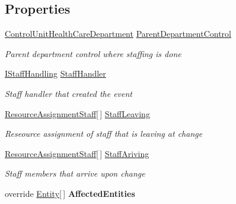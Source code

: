 \subsection*{Properties}
\begin{DoxyCompactItemize}
\item 
\hyperlink{class_general_health_care_elements_1_1_control_units_1_1_control_unit_health_care_department}{Control\+Unit\+Health\+Care\+Department} \hyperlink{class_general_health_care_elements_1_1_staff_handling_1_1_event_staff_change_a6874d8612be13bd29e3b98c02811739c}{Parent\+Department\+Control}
\begin{DoxyCompactList}\small\item\em Parent department control where staffing is done \end{DoxyCompactList}\item 
\hyperlink{interface_general_health_care_elements_1_1_staff_handling_1_1_i_staff_handling}{I\+Staff\+Handling} \hyperlink{class_general_health_care_elements_1_1_staff_handling_1_1_event_staff_change_a3fe2bdafedd93ea53a525957aabf2698}{Staff\+Handler}
\begin{DoxyCompactList}\small\item\em Staff handler that created the event \end{DoxyCompactList}\item 
\hyperlink{class_general_health_care_elements_1_1_resource_handling_1_1_resource_assignment_staff}{Resource\+Assignment\+Staff}\mbox{[}$\,$\mbox{]} \hyperlink{class_general_health_care_elements_1_1_staff_handling_1_1_event_staff_change_a1a05b49a27b84b2de048e99253d3ec3f}{Staff\+Leaving}
\begin{DoxyCompactList}\small\item\em Reseource assignment of staff that is leaving at change \end{DoxyCompactList}\item 
\hyperlink{class_general_health_care_elements_1_1_resource_handling_1_1_resource_assignment_staff}{Resource\+Assignment\+Staff}\mbox{[}$\,$\mbox{]} \hyperlink{class_general_health_care_elements_1_1_staff_handling_1_1_event_staff_change_ae0270de17b4c4e4e35cf282f2d518697}{Staff\+Ariving}
\begin{DoxyCompactList}\small\item\em Staff members that arrive upon change \end{DoxyCompactList}\item 
override \hyperlink{class_simulation_core_1_1_h_c_c_m_elements_1_1_entity}{Entity}\mbox{[}$\,$\mbox{]} {\bfseries Affected\+Entities}\hypertarget{class_general_health_care_elements_1_1_staff_handling_1_1_event_staff_change_a9cf3bfb633971ee18a62cac2716286ba}{}\label{class_general_health_care_elements_1_1_staff_handling_1_1_event_staff_change_a9cf3bfb633971ee18a62cac2716286ba}


\end{DoxyCompactItemize}
